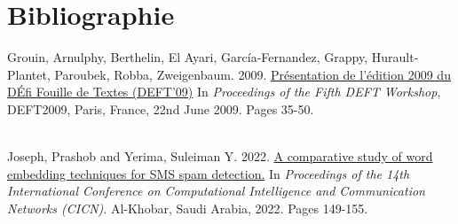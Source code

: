 \section{Bibliographie}

\hypertarget{ref1}{Grouin, Arnulphy, Berthelin, El Ayari, García-Fernandez, Grappy, Hurault-Plantet, Paroubek, Robba, Zweigenbaum. 2009. \href{https://deft.lisn.upsaclay.fr/actes/2009/pdf/0_grouin.pdf}{Présentation de l’édition 2009 du DÉfi Fouille de Textes (DEFT’09)}
In \textit{Proceedings of the Fifth DEFT Workshop}, DEFT2009, Paris, France, 22nd June 2009. Pages 35-50.}\\

\hypertarget{ref2}{Joseph, Prashob and Yerima, Suleiman Y. 2022. \href{https://www.researchgate.net/profile/Suleiman-Yerima/publication/366445312_A_Comparative_Study_of_Word_Embedding_Techniques_for_SMS_Spam_Detection/links/63a2031641663a23c0714311/A-Comparative-Study-of-Word-Embedding-Techniques-for-SMS-Spam-Detection.pdf}{A comparative study of word embedding techniques for SMS spam detection.} 
In \textit{Proceedings of the 14th International Conference on Computational Intelligence and Communication Networks (CICN)}. Al-Khobar, Saudi Arabia, 2022. Pages 149-155.}\\
